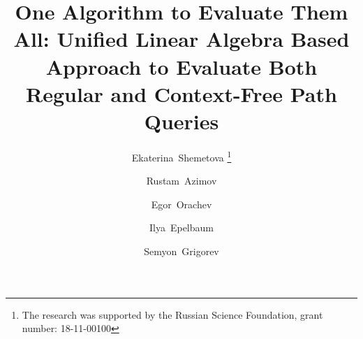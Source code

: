 \newlength\Origarrayrulewidth

\newcommand{\Cline}[1]{%
	\noalign{\global\setlength\Origarrayrulewidth{\arrayrulewidth}}%
	\noalign{\global\setlength\arrayrulewidth{3pt}}\cline{#1}%
	\noalign{\global\setlength\arrayrulewidth{\Origarrayrulewidth}}%
}

\newcommand\Thickvrule[1]{%
	\multicolumn{1}{!{\vrule width 2pt}c!{\vrule width 2pt}}{#1}%
}

\newcommand\Thickvrulel[1]{%
	\multicolumn{1}{!{\vrule width 2pt}c}{#1}%
}

\newcommand\Thickvruler[1]{%
	\multicolumn{1}{c!{\vrule width 2pt}}{#1}%
}

\newcommand\mc{\multicolumn{1}{c}{\cellcolor{lightgray}\textbf{1}}}
\newcommand{\term}[1]{\emph{#1}}
%
%


\title{One Algorithm to Evaluate Them All: Unified Linear Algebra Based Approach to Evaluate Both Regular and Context-Free Path Queries%
}


\author{Ekaterina~Shemetova  \thanks {The research was supported by the Russian Science Foundation, grant number: 18-11-00100}       \and
        Rustam~Azimov \and
            Egor~Orachev \and
             Ilya~Epelbaum \and
             Semyon~Grigorev
}



